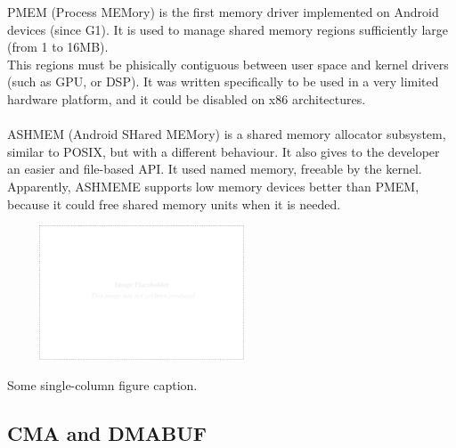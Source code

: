\documentclass[a4paper,10pt]{article}
\makeatletter
\newenvironment{figurehere}{\def\@captype{figure}\vspace{2ex}}{\vspace{2ex}}
\makeatother
\begin{document}
\begin{multicols}{2}
PMEM (Process MEMory) is the first memory driver implemented on Android devices (since G1).
It is used to manage shared memory regions sufficiently large (from 1 to 16MB).\\
This regions must be phisically contiguous between user space and kernel drivers (such as GPU, or DSP).
It was written specifically to be used in a very limited hardware platform, and it could be disabled on x86 architectures.
\\
\\
ASHMEM (Android SHared MEMory) is a shared memory allocator subsystem, similar to POSIX, but with a
different behaviour. It also gives to the developer an easier and file-based API.
It used named memory, freeable by the kernel.
Apparently, ASHMEME supports low memory devices better than PMEM, because it could
free shared memory units when it is needed.

\begin{table}
\end{table}


%


\begin{figurehere}
 \centering
 \includegraphics[width=8cm, height=4cm]{./eps/placeholder.eps}
 \caption{Some single-column figure caption.}
 \label{fig:myfigure1}
\end{figurehere}


\subsection{CMA and DMABUF}


\end{multicols}
\end{document}
